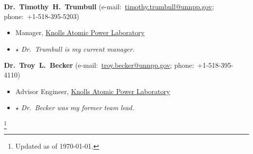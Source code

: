 \documentclass[10pt]{article}
\newcommand\blfootnote[1]{%
  \begingroup
  \renewcommand\thefootnote{}\footnote{\normalsize #1}%
  \addtocounter{footnote}{-1}%
  \endgroup
}
\newenvironment{innerlist}[1][\enskip\textbullet]%
        {\begin{itemize}[#1,leftmargin=*,parsep=0pt,itemsep=0pt,topsep=0pt,partopsep=0pt]}
        {\end{itemize}}
\newcommand{\halfblankline}{\quad\vspace{-0.5\baselineskip}\pagebreak[3]}
\begin{document}
\iffalse
\href
{http://engineering.tamu.edu/nuclear/people/madams}
{\textbf{Dr.~Marvin~L.~Adams}}
(e-mail:~\href{mailto:mladams@tamu.edu}{mladams@tamu.edu}; phone:~+1-979-845-4198)
\begin{innerlist}
    \item Professor,
        \href{http://www.nuclear.tamu.edu/}{Department of Nuclear Engineering},
        \href{http://www.tamu.edu/}{Texas A\&M University}


    \item[$\star$] \emph{Dr.~Adams was a doctoral committee member.}
\end{innerlist}
\fi
\halfblankline

{\textbf{Dr.~Timothy~H.~Trumbull}}
(e-mail:~\href{mailto:timothy.trumbull@unnpp.gov}{timothy.trumbull@unnpp.gov}; phone:~+1-518-395-5203)
\begin{innerlist}
    \item Manager,
        \href{https://navalnuclearlab.energy.gov/}{Knolls Atomic Power Laboratory}


    \item[$\star$] \emph{Dr.~Trumbull is my current manager.}
\end{innerlist}

\halfblankline

{\textbf{Dr.~Troy~L.~Becker}}
(e-mail:~\href{mailto:troy.becker@unnpp.gov}{troy.becker@unnpp.gov}; phone:~+1-518-395-4110)
\begin{innerlist}
    \item Advisor Engineer,
        \href{https://navalnuclearlab.energy.gov/}{Knolls Atomic Power Laboratory}


    \item[$\star$] \emph{Dr.~Becker was my former team lead.}
\end{innerlist}


\blfootnote{Updated as of \today.}
\end{document}
